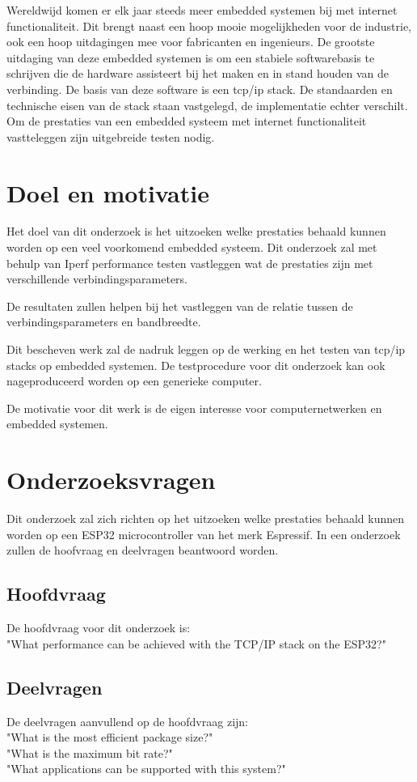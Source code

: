 \documentclass[../DCM2_Verslag.tex]{subfiles}
\begin{document}
Wereldwijd komen er elk jaar steeds meer embedded systemen bij met internet functionaliteit.
Dit brengt naast een hoop mooie mogelijkheden voor de industrie, ook een hoop uitdagingen mee voor fabricanten en ingenieurs. De grootste uitdaging van deze embedded systemen is om een stabiele softwarebasis te schrijven die de hardware assisteert bij het maken en in stand houden van de verbinding. De basis van deze software is een tcp/ip stack. De standaarden en technische eisen van de stack staan vastgelegd, de implementatie echter verschilt. Om de prestaties van een embedded systeem met internet functionaliteit vastteleggen zijn uitgebreide testen nodig. 

\section{Doel en motivatie}
Het doel van dit onderzoek is het uitzoeken welke prestaties behaald kunnen worden op een veel voorkomend embedded systeem. Dit onderzoek zal met behulp van Iperf performance testen vastleggen wat de prestaties zijn met verschillende verbindingsparameters. 

De resultaten zullen helpen bij het vastleggen van de relatie tussen de verbindingsparameters en bandbreedte. 

Dit bescheven werk zal de nadruk leggen op de werking en het testen van tcp/ip stacks op embedded systemen. De testprocedure voor dit onderzoek kan ook nageproduceerd worden op een generieke computer.

De motivatie voor dit werk is de eigen interesse voor computernetwerken en embedded systemen.

\section{Onderzoeksvragen}
Dit onderzoek zal zich richten op het uitzoeken welke prestaties behaald kunnen worden op een ESP32 microcontroller van het merk Espressif. In een onderzoek zullen de hoofvraag en deelvragen beantwoord worden. 

\subsection{Hoofdvraag}
De hoofdvraag voor dit onderzoek is:\\
"What performance can be achieved with the TCP/IP stack on the ESP32?"

\subsection{Deelvragen}
De deelvragen aanvullend op de hoofdvraag zijn:\\
"What is the most efficient package size?"\\
"What is the maximum bit rate?"\\
"What applications can be supported with this system?"\\
\end{document}
